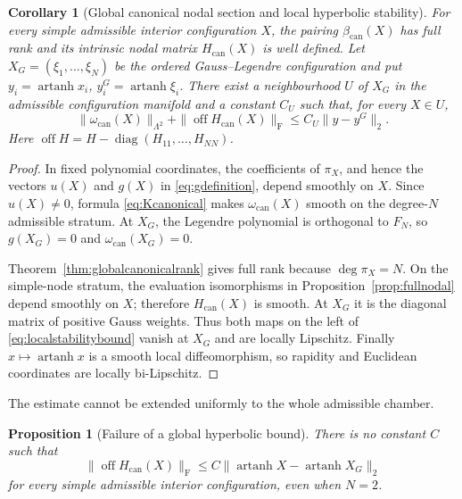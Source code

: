 \documentclass[11pt,a4paper]{article}
\newtheorem{proposition}[theorem]{Proposition}
\newtheorem{corollary}[theorem]{Corollary}
\theoremstyle{definition}
\theoremstyle{remark}
\newcommand{\diag}{\operatorname{diag}}
\begin{document}
\begin{corollary}[Global canonical nodal section and local hyperbolic stability]
\label{thm:localstability}
For every simple admissible interior configuration $X$, the pairing
$\beta_{\mathrm{can}}(X)$ has full rank and its intrinsic nodal matrix
$H_{\mathrm{can}}(X)$ is well defined.  Let
$X_G=(\xi_1,\ldots,\xi_N)$ be the ordered Gauss--Legendre configuration and put
$y_i=\operatorname{artanh}x_i$, $y_i^G=\operatorname{artanh}\xi_i$.  There exist a
neighbourhood $U$ of $X_G$ in the admissible configuration manifold and a constant $C_U$
such that, for every $X\in U$,
\begin{equation}\label{eq:localstabilitybound}
 \|\omega_{\mathrm{can}}(X)\|_{\Lambda^2}
 +\|\operatorname{off}H_{\mathrm{can}}(X)\|_{\mathrm F}
 \leq C_U\|y-y^G\|_2.
\end{equation}
Here $\operatorname{off}H=H-\diag(H_{11},\ldots,H_{NN})$.
\end{corollary}

\begin{proof}
In fixed polynomial coordinates, the coefficients of $\pi_X$, and hence the vectors $u(X)$
and $g(X)$ in \eqref{eq:gdefinition}, depend smoothly on $X$.  Since $u(X)\neq0$, formula
\eqref{eq:Kcanonical} makes $\omega_{\mathrm{can}}(X)$ smooth on the degree-$N$ admissible
stratum.  At $X_G$, the Legendre polynomial is orthogonal to $F_N$, so $g(X_G)=0$ and
$\omega_{\mathrm{can}}(X_G)=0$.

Theorem~\ref{thm:globalcanonicalrank} gives full rank because $\deg\pi_X=N$.  On the
simple-node stratum, the evaluation isomorphisms in Proposition~\ref{prop:fullnodal} depend
smoothly on $X$; therefore $H_{\mathrm{can}}(X)$ is smooth.  At $X_G$ it is the diagonal matrix of
positive Gauss weights.  Thus both maps on the left of \eqref{eq:localstabilitybound} vanish
at $X_G$ and are locally Lipschitz.  Finally $x\mapsto\operatorname{artanh}x$ is a smooth
local diffeomorphism, so rapidity and Euclidean coordinates are locally bi-Lipschitz.
\end{proof}

The estimate cannot be extended uniformly to the whole admissible chamber.

\begin{proposition}[Failure of a global hyperbolic bound]\label{prop:noglobalbound}
There is no constant $C$ such that
\begin{equation}\label{eq:falseglobalbound}
 \|\operatorname{off}H_{\mathrm{can}}(X)\|_{\mathrm F}
 \leq C\|\operatorname{artanh}X-\operatorname{artanh}X_G\|_2
\end{equation}
for every simple admissible interior configuration, even when $N=2$.
\end{proposition}
\end{document}
